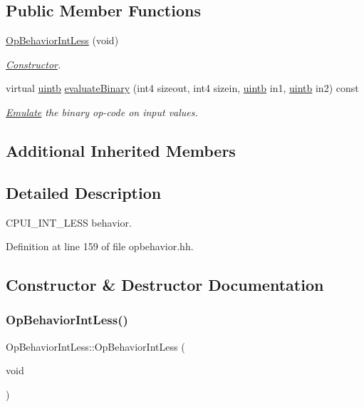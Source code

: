 \subsection*{Public Member Functions}
\begin{DoxyCompactItemize}
\item 
\mbox{\hyperlink{class_op_behavior_int_less_a5ff6be029e85d1e866517372bf22af2a}{Op\+Behavior\+Int\+Less}} (void)
\begin{DoxyCompactList}\small\item\em \mbox{\hyperlink{class_constructor}{Constructor}}. \end{DoxyCompactList}\item 
virtual \mbox{\hyperlink{types_8h_a2db313c5d32a12b01d26ac9b3bca178f}{uintb}} \mbox{\hyperlink{class_op_behavior_int_less_a906195712d6ce18877b4d1cce06aaaec}{evaluate\+Binary}} (int4 sizeout, int4 sizein, \mbox{\hyperlink{types_8h_a2db313c5d32a12b01d26ac9b3bca178f}{uintb}} in1, \mbox{\hyperlink{types_8h_a2db313c5d32a12b01d26ac9b3bca178f}{uintb}} in2) const
\begin{DoxyCompactList}\small\item\em \mbox{\hyperlink{class_emulate}{Emulate}} the binary op-\/code on input values. \end{DoxyCompactList}\end{DoxyCompactItemize}
\subsection*{Additional Inherited Members}


\subsection{Detailed Description}
C\+P\+U\+I\+\_\+\+I\+N\+T\+\_\+\+L\+E\+SS behavior. 

Definition at line 159 of file opbehavior.\+hh.



\subsection{Constructor \& Destructor Documentation}
\mbox{\label{class_op_behavior_int_less_a5ff6be029e85d1e866517372bf22af2a}} 
\subsubsection{\texorpdfstring{OpBehaviorIntLess()}{OpBehaviorIntLess()}}
{\footnotesize\ttfamily Op\+Behavior\+Int\+Less\+::\+Op\+Behavior\+Int\+Less (\begin{DoxyParamCaption}\item[{void}]{ }\end{DoxyParamCaption})\hspace{0.3cm}{\ttfamily [inline]}}



